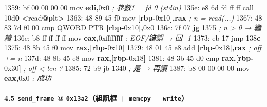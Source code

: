 \documentclass[10pt,a4paper]{article}
\newenvironment{Shaded}{\begin{snugshade}}{\end{snugshade}}
\newcommand{\BaseNTok}[1]{\textcolor[rgb]{0.00,0.00,0.81}{#1}}
\newcommand{\CommentTok}[1]{\textcolor[rgb]{0.56,0.35,0.01}{\textit{#1}}}
\newcommand{\ControlFlowTok}[1]{\textcolor[rgb]{0.13,0.29,0.53}{\textbf{#1}}}
\newcommand{\DataTypeTok}[1]{\textcolor[rgb]{0.13,0.29,0.53}{#1}}
\newcommand{\DecValTok}[1]{\textcolor[rgb]{0.00,0.00,0.81}{#1}}
\newcommand{\ErrorTok}[1]{\textcolor[rgb]{0.64,0.00,0.00}{\textbf{#1}}}
\newcommand{\FunctionTok}[1]{\textcolor[rgb]{0.13,0.29,0.53}{\textbf{#1}}}
\newcommand{\KeywordTok}[1]{\textcolor[rgb]{0.13,0.29,0.53}{\textbf{#1}}}
\newcommand{\NormalTok}[1]{#1}
\newcommand{\OperatorTok}[1]{\textcolor[rgb]{0.81,0.36,0.00}{\textbf{#1}}}
\renewenvironment{Shaded}{%
  \def\FrameCommand{\fboxsep=3.2pt\colorbox{shadecolor}}%
  \MakeFramed{\advance\hsize-\width\FrameRestore\small}%
}{%
  \endMakeFramed
}
\begin{document}
\begin{Shaded}
\begin{Highlighting}[]
\NormalTok{1359: bf }\DecValTok{00} \DecValTok{00} \DecValTok{00} \DecValTok{00}\NormalTok{         mov    }\KeywordTok{edi}\OperatorTok{,}\BaseNTok{0x0}               \CommentTok{; 參數1 = fd 0 (stdin)}
\NormalTok{135e: e8 }\DecValTok{6}\BaseNTok{d}\NormalTok{ fd ff ff         call   }\DecValTok{10}\BaseNTok{d}\ErrorTok{0} \OperatorTok{\textless{}}\NormalTok{read}\FunctionTok{@}\ErrorTok{p}\NormalTok{lt}\OperatorTok{\textgreater{}}
\NormalTok{1363: 48 89 45 f0            mov    }\OperatorTok{[}\KeywordTok{rbp}\OperatorTok{{-}}\BaseNTok{0x10}\OperatorTok{],}\KeywordTok{rax}        \CommentTok{; n = read(...)}
\NormalTok{1367: 48 83 7d f0 }\DecValTok{00}\NormalTok{         cmp    }\DataTypeTok{QWORD} \DataTypeTok{PTR} \OperatorTok{[}\KeywordTok{rbp}\OperatorTok{{-}}\BaseNTok{0x10}\OperatorTok{],}\BaseNTok{0x0}
\NormalTok{136c: 7f 07                  }\ControlFlowTok{jg}     \DecValTok{1375}                  \CommentTok{; n \textgreater{} 0 → 繼續}
\NormalTok{136e: b8 ff ff ff ff         mov    }\KeywordTok{eax}\OperatorTok{,}\BaseNTok{0xffffffff}        \CommentTok{; EOF/錯誤 → 回 {-}1}
\NormalTok{1373: eb }\DecValTok{17}\NormalTok{                  jmp    }\DecValTok{138}\ErrorTok{c}
\NormalTok{1375: 48 8b 45 f0            mov    }\KeywordTok{rax}\OperatorTok{,[}\KeywordTok{rbp}\OperatorTok{{-}}\BaseNTok{0x10}\OperatorTok{]}
\NormalTok{1379: 48 01 45 e8            add    }\OperatorTok{[}\KeywordTok{rbp}\OperatorTok{{-}}\BaseNTok{0x18}\OperatorTok{],}\KeywordTok{rax}        \CommentTok{; off += n}
\NormalTok{137d: 48 8b 45 e8            mov    }\KeywordTok{rax}\OperatorTok{,[}\KeywordTok{rbp}\OperatorTok{{-}}\BaseNTok{0x18}\OperatorTok{]}
\NormalTok{1381: 48 3b 45 d0            cmp    }\KeywordTok{rax}\OperatorTok{,[}\KeywordTok{rbp}\OperatorTok{{-}}\BaseNTok{0x30}\OperatorTok{]}        \CommentTok{; off \textless{} len ?}
\NormalTok{1385: 72 b9                  jb     }\DecValTok{1340}                  \CommentTok{; 是 → 再讀}
\NormalTok{1387: b8 }\DecValTok{00} \DecValTok{00} \DecValTok{00} \DecValTok{00}\NormalTok{         mov    }\KeywordTok{eax}\OperatorTok{,}\BaseNTok{0x0}               \CommentTok{; 成功}
\end{Highlighting}
\end{Shaded}

\paragraph{\texorpdfstring{4.5 \texttt{send\_\allowbreak{}frame} @
\texttt{0x13a2}（組訊框 + \texttt{memcpy} +
\texttt{write}）}{4.5 send\_frame @ 0x13a2（組訊框 + memcpy + write）}}\label{send_frame-0x13a2ux7d44ux8a0aux6846-memcpy-write}
\end{document}
